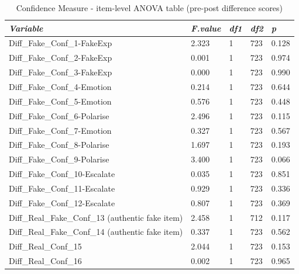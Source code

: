 \documentclass[empirical, authordate, issue]{jote-new-article}
\begin{document}
\begin{table}

  \caption{Confidence Measure - item-level ANOVA table (pre-post difference scores)}
  \label{tab:tableS27}


  \begin{tabularx}{\linewidth}{@{} X  l  l  l  l@{}}

    \toprule
    \emph{Variable}                                  & \emph{F.value} & \emph{df1} & \emph{df2} & \emph{p} \\
    \midrule
    Diff\_Fake\_Conf\_1-FakeExp                      & 2.323          & 1          & 723        & 0.128    \\
    Diff\_Fake\_Conf\_2-FakeExp                      & 0.001          & 1          & 723        & 0.974    \\
    Diff\_Fake\_Conf\_3-FakeExp                      & 0.000          & 1          & 723        & 0.990    \\
    Diff\_Fake\_Conf\_4-Emotion                      & 0.214          & 1          & 723        & 0.644    \\
    Diff\_Fake\_Conf\_5-Emotion                      & 0.576          & 1          & 723        & 0.448    \\
    Diff\_Fake\_Conf\_6-Polarise                     & 2.496          & 1          & 723        & 0.115    \\
    Diff\_Fake\_Conf\_7-Emotion                      & 0.327          & 1          & 723        & 0.567    \\
    Diff\_Fake\_Conf\_8-Polarise                     & 1.697          & 1          & 723        & 0.193    \\
    Diff\_Fake\_Conf\_9-Polarise                     & 3.400          & 1          & 723        & 0.066    \\
    Diff\_Fake\_Conf\_10-Escalate                    & 0.035          & 1          & 723        & 0.851    \\
    Diff\_Fake\_Conf\_11-Escalate                    & 0.929          & 1          & 723        & 0.336    \\
    Diff\_Fake\_Conf\_12-Escalate                    & 0.807          & 1          & 723        & 0.369    \\
    Diff\_Real\_Fake\_Conf\_13 (authentic fake item) & 2.458          & 1          & 712        & 0.117    \\
    Diff\_Real\_Fake\_Conf\_14 (authentic fake item) & 0.337          & 1          & 723        & 0.562    \\
    Diff\_Real\_Conf\_15                             & 2.044          & 1          & 723        & 0.153    \\
    Diff\_Real\_Conf\_16                             & 0.002          & 1          & 723        & 0.965    \\
    \bottomrule
  \end{tabularx}


\end{table}
\end{document}
